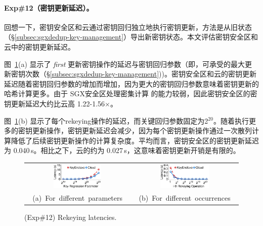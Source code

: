 \paragraph*{Exp\#12（密钥更新延迟）。} 回想一下，密钥安全区和云通过密钥回归独立地执行密钥更新，方法是从旧状态（\S\ref{subsec:sgxdedup-key-management}）导出新密钥状态。本文评估密钥安全区和云中的密钥更新延迟。

图~\ref{fig:sgxdedup-rekeyingLatency}(a) 显示了 \textit{ first} 更新密钥操作的延迟与密钥回归参数（即，可承受的最大更新密钥次数（\S\ref{subsec:sgxdedup-key-management}))。密钥安全区和云的密钥更新延迟随着密钥回归参数的增加而增加，因为更大的密钥回归参数意味着密钥更新的哈希计算更多。由于 SGX安全区处理密集计算 \cite{harnik18} 的能力较弱，因此密钥安全区的密钥更新延迟大约比云高 1.22-1.56$\times$。

图~\ref{fig:sgxdedup-rekeyingLatency}(b) 显示了每个rekeying操作的延迟，而关键回归参数固定为2$^{20}$。随着执行更多的密钥更新操作，密钥更新延迟会减少，因为每个密钥更新操作通过一次散列计算降低了后续密钥更新操作的计算复杂度。平均而言，密钥安全区的密钥更新延迟为 0.040\,s。相比之下，云的约为 0.027\,s，这意味着密钥更新开销是有限的。

\begin{figure}[t]
\centering
\begin{tabular}{@{\ }c@{\ }c}
\includegraphics[width=0.48\textwidth]{pic/sgxdedup/expa5_keyRegression_time.pdf} &
\includegraphics[width=0.48\textwidth]{pic/sgxdedup/expa5_keyRegression_time_default.pdf} \\
\mbox{\small (a) For different parameters} &
\mbox{\small (b) For different occurrences}
\end{tabular}
\caption{(Exp\#12) Rekeying latencies.}
\label{fig:sgxdedup-rekeyingLatency}
\end{figure}
